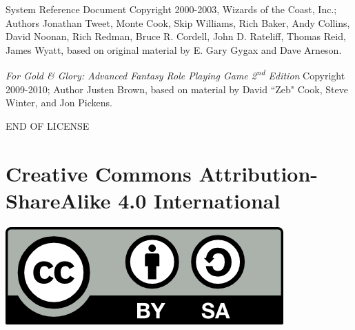 \begin{multicols}{2}
System Reference Document Copyright 2000-2003, Wizards of the Coast, Inc.; Authors Jonathan Tweet, Monte Cook, Skip Williams, Rich Baker, Andy Collins, David Noonan, Rich Redman, Bruce R. Cordell, John D. Rateliff, Thomas Reid, James Wyatt, based on original material by E. Gary Gygax and Dave Arneson. 

\textit{For Gold \& Glory\texttrademark: Advanced Fantasy Role Playing Game 2\textsuperscript{nd} Edition} Copyright 2009-2010; Author Justen Brown, based on material by David ``Zeb" Cook, Steve Winter, and Jon Pickens.

\noindent END OF LICENSE




\section{Creative Commons Attribution-ShareAlike 4.0 International}

\begin{center}
\noindent \includegraphics{by-sa.png}
\end{center}


\end{multicols}
